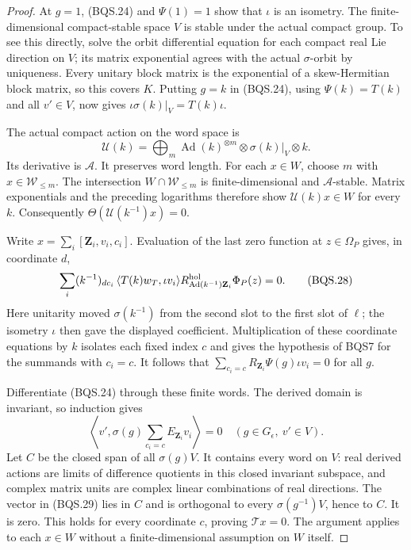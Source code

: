 \documentclass[11pt,a4paper]{article}
\numberwithin{equation}{section}
\theoremstyle{remark}\newtheorem{remark}[theorem]{Remark}
\begin{document}
\begin{proof}
At $g=1$, (BQS.24) and $\Psi(1)=1$ show that $\iota$ is an isometry.
The finite-dimensional compact-stable space $V$ is stable under the
actual compact group.  To see this directly, solve the orbit differential
equation for each compact real Lie direction on $V$; its matrix
exponential agrees with the actual $\sigma$-orbit by uniqueness.
Every unitary block matrix is the exponential of a skew-Hermitian block
matrix, so this covers $K$.
Putting $g=k$ in (BQS.24), using $\Psi(k)=T(k)$ and all $v'\in V$,
now gives $\iota\sigma(k)|_V=T(k)\iota$.

The actual compact action on the word space is
\[
 \mathcal U(k)=
  \bigoplus_m\operatorname{Ad}(k)^{\otimes m}
                    \otimes\sigma(k)|_V\otimes k.
 \tag{BQS.27}
\]
Its derivative is $\mathcal A$.  It preserves word length.
For each $x\in W$, choose $m$ with $x\in\mathcal W_{\le m}$.
The intersection $W\cap\mathcal W_{\le m}$ is finite-dimensional and
$\mathcal A$-stable.  Matrix exponentials and the preceding logarithms
therefore show $\mathcal U(k)x\in W$ for every $k$.
Consequently $\Theta(\mathcal U(k^{-1})x)=0$.

Write $x=\sum_i[\mathbf Z_i,v_i,c_i]$.
Evaluation of the last zero function at $z\in\Omega_P$ gives, in
coordinate $d$,
\[
 \sum_i(k^{-1})_{dc_i}\,
   \langle T(k)w_T,\iota v_i\rangle
   R^{\rm hol}_{\operatorname{Ad}(k^{-1})\mathbf Z_i}
                                 \Phi_P(z)=0.
 \tag{BQS.28}
\]
Here unitarity moved $\sigma(k^{-1})$ from the second slot to the
first slot of $\ell$; the isometry $\iota$ then gave the displayed
coefficient.  Multiplication of these coordinate equations by $k$
isolates each fixed index $c$ and gives the hypothesis of BQS7 for
the summands with $c_i=c$.
It follows that
$\sum_{c_i=c}R_{\mathbf Z_i}\Psi(g)\iota v_i=0$
for all $g$.

Differentiate (BQS.24) through these finite words.  The derived
domain is invariant, so induction gives
\[
 \left\langle v',\sigma(g)
       \sum_{c_i=c}E_{\mathbf Z_i}v_i\right\rangle=0
             \quad(g\in G_\epsilon,\ v'\in V).
 \tag{BQS.29}
\]
Let $C$ be the closed span of all $\sigma(g)V$.  It contains every
word on $V$: real derived actions are limits of difference quotients
in this closed invariant subspace, and complex matrix units are
complex linear combinations of real directions.
The vector in (BQS.29) lies in $C$ and is orthogonal to every
$\sigma(g^{-1})V$, hence to $C$.  It is zero.
This holds for every coordinate $c$, proving $\mathcal T x=0$.
The argument applies to each $x\in W$ without a finite-dimensional
assumption on $W$ itself.
\end{proof}
\end{document}
